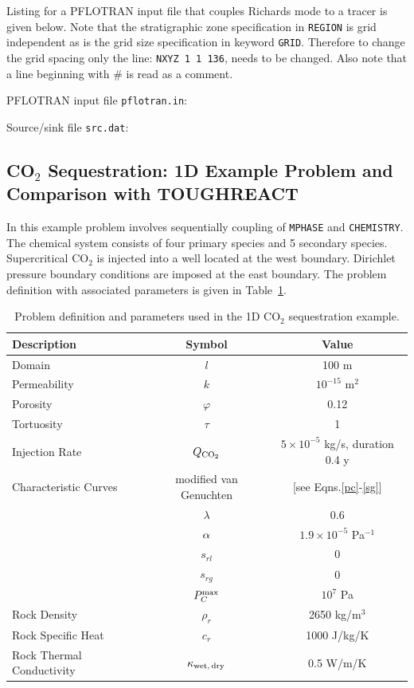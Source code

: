 Listing for a PFLOTRAN input file that couples Richards mode to a tracer is given below. Note that the stratigraphic zone specification in {\tt REGION} is grid independent as is the grid size specification in keyword {\tt GRID}. Therefore to change the grid spacing only the line: {\tt NXYZ 1 1 136}, needs to be changed. Also note that a line beginning with \# is read as a comment.

\bigskip

\noindent PFLOTRAN input file {\tt pflotran.in}: 
\footnotesize
{}

\clearpage

\normalsize
\noindent
Source/sink file {\tt src.dat}:
\footnotesize
{}
\normalsize


\subsection{CO$_2$ Sequestration: 1D Example Problem and Comparison with TOUGHREACT}

In this example problem involves sequentially coupling of {\tt MPHASE} and {\tt CHEMISTRY}. The chemical system consists of four primary species and 5 secondary species. Supercritical CO$_2$ is injected into a well located at the west boundary. Dirichlet pressure boundary conditions are imposed at the east boundary. The problem definition with associated parameters is given in Table~\ref{tco2}.

\begin{table}[h]\centering
\caption{Problem definition and parameters used in the 1D CO$_2$ sequestration example.}
\label{tco2}
\vspace{3mm}
\begin{tabular}{lcc}
\toprule
Description & Symbol & Value\\
\midrule
Domain & $l$ & 100 m\\
Permeability & $k$ & $10^{-15}$ m$^2$\\
Porosity & $\varphi$ & 0.12\\
Tortuosity & $\tau$ & 1\\
Injection Rate & $Q_{\rm CO_2}$ & $5\times 10^{-5}$ kg/s, duration 0.4 y\\
Characteristic Curves & modified van Genuchten & [see Eqns.\eqref{pc}-\eqref{sg}]\\
& $\lambda$ & 0.6\\
& ${\alpha}$ & $1.9 \times 10^{-5}$ Pa$^{-1}$\\
& $s_{rl}$ & 0\\
& $s_{rg}$ & 0\\
& $P_C^{\rm max}$ & $10^7$ Pa\\
Rock Density & $\rho_r$ & 2650 kg/m$^3$\\
Rock Specific Heat & $c_r$ & 1000 J/kg/K\\
Rock Thermal Conductivity & $\kappa_{\rm wet,\,dry}$ & 0.5 W/m/K\\
\bottomrule
\end{tabular}
\end{table}

